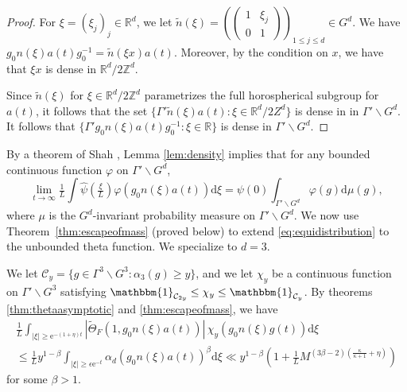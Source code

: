 \documentclass[12pt]{amsart}
\theoremstyle{definition}
\theoremstyle{remark}
\numberwithin{equation}{section}
\newcommand{\dd}{\mathrm{d}}
\newcommand{\R}{\mathbb{R}}
\newcommand{\Z}{\mathbb{Z}}
\newcommand{\e}{\mathrm{e}}
\newcommand{\cC}{\mathcal{C}}
\begin{document}
\begin{proof}
  For $\xi = (\xi_j)_j \in \R^d$, we let $\tilde n(\xi) = \left(  \begin{pmatrix}   1 & \xi_j \\
    0 & 1
  \end{pmatrix}
  \right)_{\!\!1\leq j\leq d} \in G^d$.
  We have $g_0 n(\xi)a(t) g_0^{-1} = \tilde n(\xi x) a(t)$.
  Moreover, by the condition on $x$, we have that $\xi x$ is dense in $\R^d / 2\Z^d$.

  Since $\tilde n(\xi)$ for $\xi \in \R^d / 2\Z^d$ parametrizes the full horospherical subgroup for $a(t)$, it follows that the set $\{\Gamma' \tilde n(\xi)a(t) : \xi \in \R^d / 2Z^d\}$ is dense in in $\Gamma' \backslash G^d$.
  It follows that $\{\Gamma' g_0 n(\xi) a(t) g_0^{-1} : \xi \in \R\}$ is dense in $\Gamma' \backslash G^d$.
\end{proof}

By a theorem of Shah \cite{MR1403756}, Lemma \ref{lem:density} implies that for any bounded continuous function $\varphi$ on $\Gamma' \backslash G^d$,
\begin{equation}
  \label{eq:equidistribution}
  \lim_{t\to \infty} \tfrac{1}{L} \int \hat\psi( \tfrac{\xi}{L}) \varphi(g_0n(\xi)a(t)) \dd \xi = \psi(0)\int_{\Gamma' \backslash G^d} \varphi(g) \dd \mu(g),
\end{equation}
where $\mu$ is the $G^d$-invariant probability measure on $\Gamma' \backslash G^d$.
We now use Theorem~\ref{thm:escapeofmass} (proved below) to extend \eqref{eq:equidistribution} to the unbounded theta function.
We specialize to $d = 3$.

We let $\cC_y = \{g \in \Gamma^3 \backslash G^3 : \alpha_3(g) \geq y\}$, and we let $\chi_y$ be a continuous function on $\Gamma' \backslash G^3$ satisfying $\mathbbm{1}_{\cC_{2y}} \leq \chi_y \leq \mathbbm{1}_{\cC_y}$.
By theorems \ref{thm:thetaasymptotic} and \ref{thm:escapeofmass}, we have
\begin{multline}
  \label{eq:tailestimate}
  \tfrac{1}{L} \int_{|\xi| \geq \e^{-(1 + \eta)t}} |\widetilde\Theta_F(1, g_0n(\xi) a(t))| \, \chi_y(g_0n(\xi)g(t)) \dd \xi \\
  \leq \tfrac{1}{L} y^{1 - \beta} \int_{|\xi| \geq \epsilon \e^{-t}} \alpha_d(g_0n(\xi) a(t))^\beta \dd \xi \ll y^{1-\beta}( 1 + \tfrac{1}{L} M^{(3\beta -2) (\frac{\kappa}{\kappa + 1} + \eta)})
\end{multline}
for some $\beta > 1$.
\end{document}
